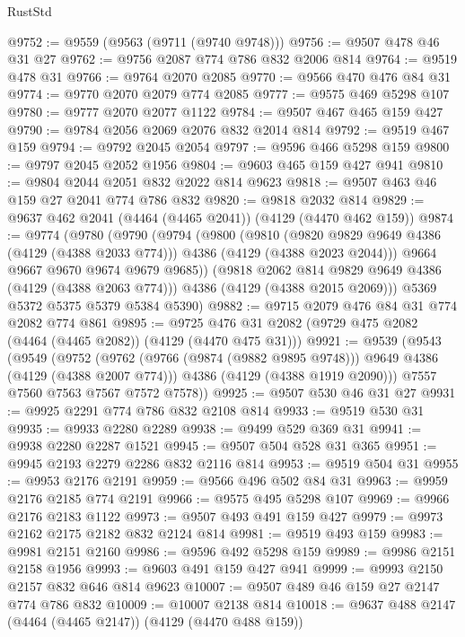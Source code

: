 \begin{lexlean}{RustStd}
\begin{coremodule}
{\begin{coremodule}
{{{{{{{{{{{{{{@9752 := @9559 (@9563 (@9711 (@9740 @9748)))
@9756 := @9507 @478 @46 @31 @27
@9762 := @9756 @2087 @774 @786 @832 @2006 @814
@9764 := @9519 @478 @31
@9766 := @9764 @2070 @2085
@9770 := @9566 @470 @476 @84 @31
@9774 := @9770 @2070 @2079 @774 @2085
@9777 := @9575 @469 @5298 @107
@9780 := @9777 @2070 @2077 @1122
@9784 := @9507 @467 @465 @159 @427
@9790 := @9784 @2056 @2069 @2076 @832 @2014 @814
@9792 := @9519 @467 @159
@9794 := @9792 @2045 @2054
@9797 := @9596 @466 @5298 @159
@9800 := @9797 @2045 @2052 @1956
@9804 := @9603 @465 @159 @427 @941
@9810 := @9804 @2044 @2051 @832 @2022 @814 @9623
@9818 := @9507 @463 @46 @159 @27 @2041 @774 @786 @832
@9820 := @9818 @2032 @814
@9829 := @9637 @462 @2041 (@4464 (@4465 @2041)) (@4129 (@4470 @462 @159))
@9874 := @9774
    (@9780
      (@9790
        (@9794
          (@9800
            (@9810
              (@9820 @9829 @9649 @4386 (@4129 (@4388 @2033 @774)))
              @4386
              (@4129 (@4388 @2023 @2044)))
            @9664
            @9667
            @9670
            @9674
            @9679
            @9685))
        (@9818 @2062 @814 @9829 @9649 @4386 (@4129 (@4388 @2063 @774)))
        @4386
        (@4129 (@4388 @2015 @2069)))
      @5369
      @5372
      @5375
      @5379
      @5384
      @5390)
@9882 := @9715 @2079 @476 @84 @31 @774 @2082 @774 @861
@9895 := @9725 @476 @31 @2082 (@9729 @475 @2082 (@4464 (@4465 @2082)) (@4129 (@4470 @475 @31)))
@9921 := @9539
    (@9543
      (@9549
        (@9752
          (@9762 (@9766 (@9874 (@9882 @9895 @9748))) @9649 @4386 (@4129 (@4388 @2007 @774)))
          @4386
          (@4129 (@4388 @1919 @2090)))
        @7557
        @7560
        @7563
        @7567
        @7572
        @7578))
@9925 := @9507 @530 @46 @31 @27
@9931 := @9925 @2291 @774 @786 @832 @2108 @814
@9933 := @9519 @530 @31
@9935 := @9933 @2280 @2289
@9938 := @9499 @529 @369 @31
@9941 := @9938 @2280 @2287 @1521
@9945 := @9507 @504 @528 @31 @365
@9951 := @9945 @2193 @2279 @2286 @832 @2116 @814
@9953 := @9519 @504 @31
@9955 := @9953 @2176 @2191
@9959 := @9566 @496 @502 @84 @31
@9963 := @9959 @2176 @2185 @774 @2191
@9966 := @9575 @495 @5298 @107
@9969 := @9966 @2176 @2183 @1122
@9973 := @9507 @493 @491 @159 @427
@9979 := @9973 @2162 @2175 @2182 @832 @2124 @814
@9981 := @9519 @493 @159
@9983 := @9981 @2151 @2160
@9986 := @9596 @492 @5298 @159
@9989 := @9986 @2151 @2158 @1956
@9993 := @9603 @491 @159 @427 @941
@9999 := @9993 @2150 @2157 @832 @646 @814 @9623
@10007 := @9507 @489 @46 @159 @27 @2147 @774 @786 @832
@10009 := @10007 @2138 @814
@10018 := @9637 @488 @2147 (@4464 (@4465 @2147)) (@4129 (@4470 @488 @159))
}}}}}}}}}}}}}}
\end{coremodule}}
\end{coremodule}
\end{lexlean}
